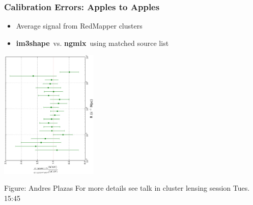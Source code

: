 \documentclass{beamer}
\newcommand{\ngmix}{{\bf ngmix}}
\newcommand{\imshape}{{\bf im3shape}}
\begin{document}
\frame
{
    \frametitle{Calibration Errors: Apples to Apples}

    \fontsize{9}{0.8\baselineskip}
    \begin{itemize}

        \item Average signal from RedMapper clusters

        \item \imshape\ vs. \ngmix\ using matched source list

        


    \end{itemize}

    \begin{center}
        \includegraphics[width=0.35\textwidth,angle=-90]{dsig_ratio_crop.pdf}
    \end{center}
    {\tiny Figure: Andres Plazas
        For more details see talk in cluster lensing
            session Tues. 15:45
        }
}
\end{document}
